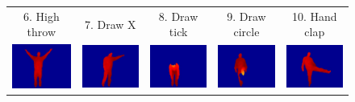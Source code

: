 \documentclass[final,3p,times,twocolumn]{elsarticle}
\begin{document}
\begin{figure}[ht]
{\begin{tabular}{ccccc}
			6. High throw &          7. Draw X &          8. Draw tick &           9. Draw circle &          10. Hand clap\\
			
			\includegraphics[width=0.4\columnwidth]{Figures/MSRAction3D_twohandwave.pdf} &          \includegraphics[width=0.4\columnwidth]{Figures/MSRAction3D_sideboxing.pdf} &          \includegraphics[width=0.4\columnwidth]{Figures/MSRAction3D_bend.pdf} &          \includegraphics[width=0.4\columnwidth]{Figures/MSRAction3D_forwardkick.pdf} &          \includegraphics[width=0.4\columnwidth]{Figures/MSRAction3D_sidekick.pdf} \\
			

\end{tabular}}
\end{figure}
\end{document}
